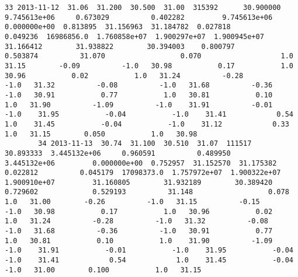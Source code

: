 \documentclass[11pt]{article}
\begin{document}
\begin{Verbatim}[commandchars=\\\{\}]
        33 2013-11-12  31.06  31.200  30.500  31.00  315392      30.900000  9.745613e+06     0.673029          0.402282         9.745613e+06         0.000000e+00  0.813895  31.156963  31.184782  0.027818          0.049236  16986856.0  1.760858e+07  1.900297e+07  1.900945e+07         31.166412        31.938822        30.394003    0.800797             0.503874          31.070                  0.070                   1.0   31.15        -0.09          -1.0   30.98           0.17           1.0   30.96           0.02           1.0   31.24          -0.28          -1.0   31.32          -0.08          -1.0   31.68          -0.36          -1.0   30.91           0.77           1.0   30.81           0.10           1.0   31.90          -1.09          -1.0    31.91          -0.01           -1.0    31.95           -0.04           -1.0    31.41            0.54            1.0    31.45           -0.04           -1.0    31.12            0.33            1.0   31.15        0.050           1.0   30.98   
        34 2013-11-13  30.74  31.100  30.510  31.07  111517      30.893333  3.445132e+06     0.960591          0.489950         3.445132e+06         0.000000e+00  0.752957  31.152570  31.175382  0.022812          0.045179  17098373.0  1.757972e+07  1.900322e+07  1.900910e+07         31.160805        31.932189        30.389420    0.729602             0.529193          31.148                  0.078                   1.0   31.00        -0.26          -1.0   31.15          -0.15          -1.0   30.98           0.17           1.0   30.96           0.02           1.0   31.24          -0.28          -1.0   31.32          -0.08          -1.0   31.68          -0.36          -1.0   30.91           0.77           1.0   30.81           0.10           1.0    31.90          -1.09           -1.0    31.91           -0.01           -1.0    31.95           -0.04           -1.0    31.41            0.54            1.0    31.45           -0.04           -1.0   31.00        0.100           1.0   31.15   
        

\end{Verbatim}
\end{document}
